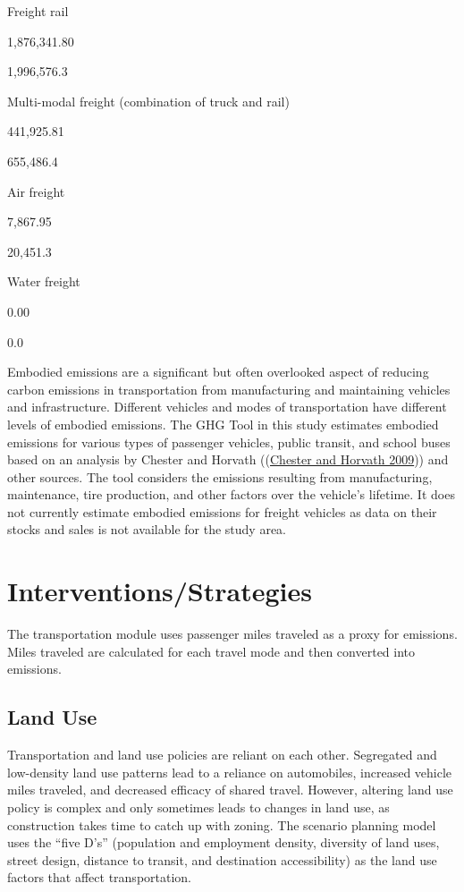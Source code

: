 \documentclass[
]{book}
\begin{document}
Freight rail

1,876,341.80

1,996,576.3

Multi-modal freight (combination of truck and rail)

441,925.81

655,486.4

Air freight

7,867.95

20,451.3

Water freight

0.00

0.0

Embodied emissions are a significant but often overlooked aspect of reducing carbon emissions in transportation from manufacturing and maintaining vehicles and infrastructure. Different vehicles and modes of transportation have different levels of embodied emissions. The GHG Tool in this study estimates embodied emissions for various types of passenger vehicles, public transit, and school buses based on an analysis by Chester and Horvath ((\protect\hyperlink{ref-Chester_Horvath_2009}{Chester and Horvath 2009})) and other sources. The tool considers the emissions resulting from manufacturing, maintenance, tire production, and other factors over the vehicle's lifetime. It does not currently estimate embodied emissions for freight vehicles as data on their stocks and sales is not available for the study area.

\hypertarget{interventionsstrategies}{%
\section{Interventions/Strategies}\label{interventionsstrategies}}

The transportation module uses passenger miles traveled as a proxy for emissions. Miles traveled are calculated for each travel mode and then converted into emissions.

\hypertarget{land-use}{%
\subsection{Land Use}\label{land-use}}

Transportation and land use policies are reliant on each other. Segregated and low-density land use patterns lead to a reliance on automobiles, increased vehicle miles traveled, and decreased efficacy of shared travel. However, altering land use policy is complex and only sometimes leads to changes in land use, as construction takes time to catch up with zoning. The scenario planning model uses the ``five D's'' (population and employment density, diversity of land uses, street design, distance to transit, and destination accessibility) as the land use factors that affect transportation.
\end{document}

